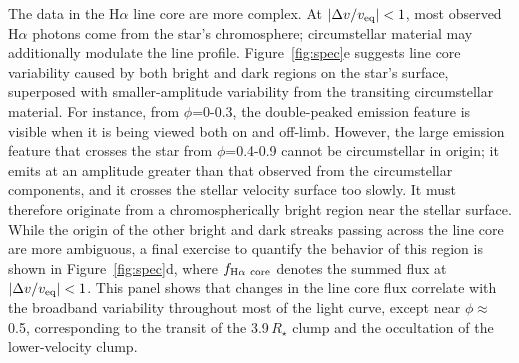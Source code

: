 \documentclass{nature3}
\begin{document}
The data in the H$\alpha$ line core are more complex.  At $|\Delta v /
v_{\rm eq}|<1$, most observed H$\alpha$ photons come from the star's
chromosphere; circumstellar material may additionally modulate the
line profile.
Figure~\ref{fig:spec}e suggests line core variability caused by both
bright and dark regions on the star's surface, superposed
with smaller-amplitude variability from the transiting circumstellar
material.
For instance, from $\phi$=0-0.3, the double-peaked emission feature
is visible when it is being viewed both on and off-limb.
However, the large emission feature that crosses the star from
$\phi$=0.4-0.9 cannot be circumstellar in origin; it emits at an
amplitude greater than that observed from the circumstellar
components, and it crosses the stellar velocity surface too slowly.
It must therefore originate from a chromospherically bright region
near the stellar surface.
While the origin of the other bright and dark streaks passing across the
line core are more ambiguous,
a final exercise to quantify the behavior of this region is shown in
Figure~\ref{fig:spec}d, where $f_{\rm H\alpha\ core}$ denotes the
summed flux at $|\Delta v / v_{\rm eq}|<1$.  This panel shows that
changes in the line core flux correlate with the broadband variability
throughout most of the light curve, except near $\phi$$\approx$0.5,
corresponding to the transit of the 3.9\,$R_\star$ clump and the
occultation of the lower-velocity clump.
\end{document}
